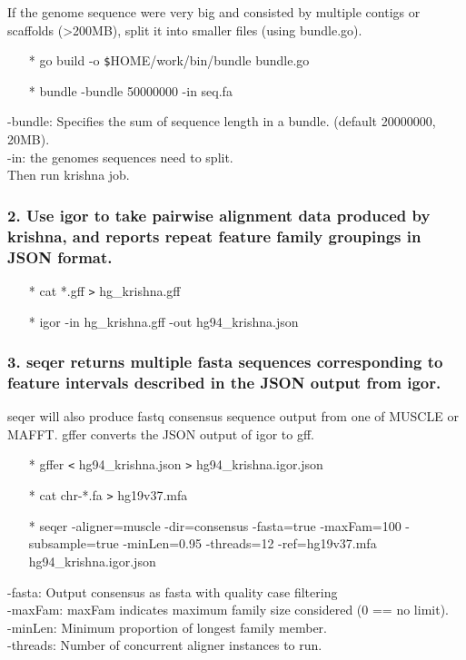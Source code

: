 \documentclass[12pt]{report}
\begin{document}
\noindent If the genome sequence were very big and consisted by multiple contigs or scaffolds (>200MB), split it into smaller files (using bundle.go).\\
\begin{enumerate}
	\item[*] go build -o \texttt{\$}HOME/work/bin/bundle bundle.go
	\item[*] bundle -bundle 50000000 -in seq.fa
\end{enumerate}

-bundle: Specifies the sum of sequence length in a bundle. (default 20000000, 20MB).\\
-in: the genomes sequences need to split.\\
Then run krishna job.\\

\subsubsection{2. Use igor to take pairwise alignment data produced by krishna, and reports repeat feature family groupings in JSON format.}
\begin{enumerate}
	\item[*] cat *.gff \texttt{>} hg\_krishna.gff
	\item[*] igor -in hg\_krishna.gff -out hg94\_krishna.json
\end{enumerate}

\subsubsection{3. seqer returns multiple fasta sequences corresponding to feature intervals described in the JSON output from igor.}
seqer will also produce fastq consensus sequence output from one of MUSCLE or MAFFT. gffer converts the JSON output of igor to gff.
\begin{enumerate}
	\item[*] gffer \texttt{<} hg94\_krishna.json \texttt{>} hg94\_krishna.igor.json
	\item[*] cat chr-*.fa \texttt{>} hg19v37.mfa
	\item[*] seqer -aligner=muscle -dir=consensus -fasta=true -maxFam=100 -subsample=true -minLen=0.95 -threads=12 -ref=hg19v37.mfa hg94\_krishna.igor.json
	
\end{enumerate}
-fasta: Output consensus as fasta with quality case filtering\\
-maxFam: maxFam indicates maximum family size considered (0 == no limit).\\
-minLen: Minimum proportion of longest family member.\\
-threads: Number of concurrent aligner instances to run.
\end{document}
